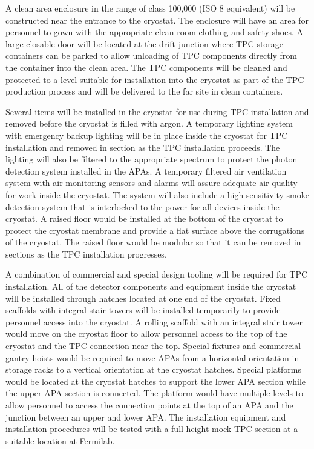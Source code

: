 A clean area enclosure in the range of class 100,000 (ISO 8
equivalent) will be constructed near the entrance to the cryostat. The
enclosure will have an area for personnel to gown with the appropriate
clean-room clothing and safety shoes. A large closable door will be
located at the drift junction where TPC storage containers can be
parked to allow unloading of TPC components directly from the
container into the clean area. The TPC components will be cleaned and
protected to a level suitable for installation into the cryostat as
part of the TPC production process and will be delivered to the far
site in clean containers.

Several items will be installed in the cryostat for use during TPC
installation and removed before the cryostat is filled with argon. A
temporary lighting system with emergency backup lighting will be in
place inside the cryostat for TPC installation and removed in section
as the TPC installation proceeds. The lighting will also be filtered
to the appropriate spectrum to protect the photon detection system
installed in the APAs. A temporary filtered air ventilation system
with air monitoring sensors and alarms will assure adequate air
quality for work inside the cryostat. The system will also include a
high sensitivity smoke detection system that is interlocked to the
power for all devices inside the cryostat. A raised floor would be
installed at the bottom of the cryostat to protect the cryostat
membrane and provide a flat surface above the corrugations of the
cryostat. The raised floor would be modular so that it can be removed
in sections as the TPC installation progresses.

A combination of commercial and special design tooling will be
required for TPC installation. All of the detector components and
equipment inside the cryostat will be installed through hatches
located at one end of the cryostat.  Fixed scaffolds with integral
stair towers will be installed temporarily to provide personnel access
into the cryostat. A rolling scaffold with an integral stair tower
would move on the cryostat floor to allow personnel access to the top
of the cryostat and the TPC connection near the top.  Special fixtures
and commercial gantry hoists would be required to move APAs from a
horizontal orientation in storage racks to a vertical orientation at
the cryostat hatches. Special platforms would be located at the
cryostat hatches to support the lower APA section while the upper APA
section is connected. The platform would have multiple levels to allow
personnel to access the connection points at the top of an APA and the
junction between an upper and lower APA. The installation equipment
and installation procedures will be tested with a full-height mock TPC
section at a suitable location at Fermilab.

